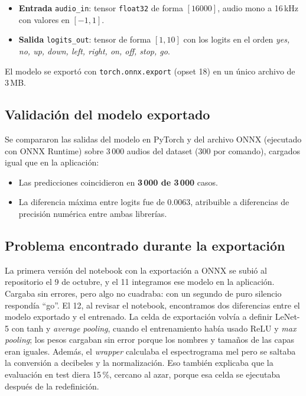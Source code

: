 \documentclass[conference]{IEEEtran}
\begin{document}
\begin{itemize}
  \item \textbf{Entrada} \texttt{audio\_in}: tensor \texttt{float32} de forma $[16000]$, audio mono a 16\,kHz con valores en $[-1, 1]$.
  \item \textbf{Salida} \texttt{logits\_out}: tensor de forma $[1, 10]$ con los logits en el orden \textit{yes, no, up, down, left, right, on, off, stop, go}.
\end{itemize}

El modelo se exportó con \texttt{torch.onnx.export} (opset 18) en un único archivo de 3\,MB.

\subsection{Validación del modelo exportado}
Se compararon las salidas del modelo en PyTorch y del archivo ONNX (ejecutado con ONNX Runtime) sobre 3\,000 audios del dataset (300 por comando), cargados igual que en la aplicación:

\begin{itemize}
  \item Las predicciones coincidieron en \textbf{3\,000 de 3\,000} casos.
  \item La diferencia máxima entre logits fue de 0.0063, atribuible a diferencias de precisión numérica entre ambas librerías.
\end{itemize}

\subsection{Problema encontrado durante la exportación}
La primera versión del notebook con la exportación a ONNX se subió al repositorio el 9 de octubre, y el 11 integramos ese modelo en la aplicación. Cargaba sin errores, pero algo no cuadraba: con un segundo de puro silencio respondía ``go''. El 12, al revisar el notebook, encontramos dos diferencias entre el modelo exportado y el entrenado. La celda de exportación volvía a definir LeNet-5 con tanh y \textit{average pooling}, cuando el entrenamiento había usado ReLU y \textit{max pooling}; los pesos cargaban sin error porque los nombres y tamaños de las capas eran iguales. Además, el \textit{wrapper} calculaba el espectrograma mel pero se saltaba la conversión a decibeles y la normalización. Eso también explicaba que la evaluación en test diera 15\,\%, cercano al azar, porque esa celda se ejecutaba después de la redefinición.
\end{document}
